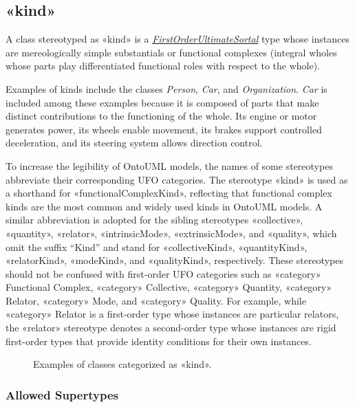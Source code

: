 \subsection{«kind»}
\label{stereotype:kind}

A class stereotyped as «kind» is a \hyperref[stereotype:firstOrderUltimateSortal]{\textit{FirstOrderUltimateSortal}} type whose instances are mereologically simple substantials or functional complexes (integral wholes whose parts play differentiated functional roles with respect to the whole).

Examples of kinds include the classes \textit{Person}, \textit{Car}, and \textit{Organization}. \textit{Car} is included among these examples because it is composed of parts that make distinct contributions to the functioning of the whole. Its engine or motor generates power, its wheels enable movement, its brakes support controlled deceleration, and its steering system allows direction control.

To increase the legibility of OntoUML models, the names of some stereotypes abbreviate their corresponding UFO categories. The stereotype «kind» is used as a shorthand for «functionalComplexKind», reflecting that functional complex kinds are the most common and widely used kinds in OntoUML models. A similar abbreviation is adopted for the sibling stereotypes «collective», «quantity», «relator», «intrinsicMode», «extrinsicMode», and «quality», which omit the suffix “Kind” and stand for «collectiveKind», «quantityKind», «relatorKind», «modeKind», and «qualityKind», respectively. These stereotypes should not be confused with first-order UFO categories such as «category» Functional Complex, «category» Collective, «category» Quantity, «category» Relator, «category» Mode, and «category» Quality. For example, while «category» Relator is a first-order type whose instances are particular relators, the «relator» stereotype denotes a second-order type whose instances are rigid first-order types that provide identity conditions for their own instances.

\begin{figure}[h]
    \centering
    
    \caption{Examples of classes categorized as «kind».}
    \label{fig:kind-example}
\end{figure}

\subsubsection{Allowed Supertypes}

